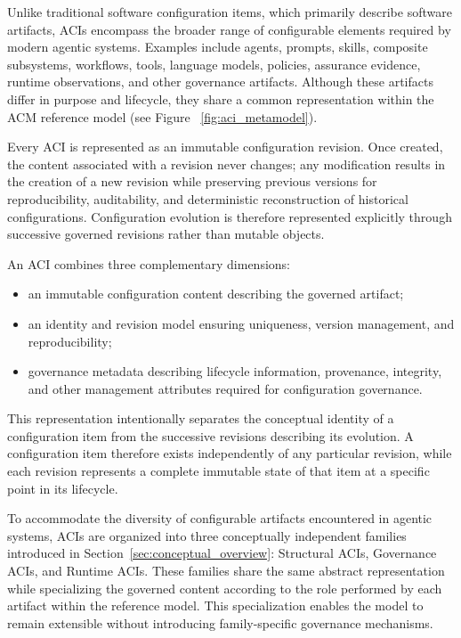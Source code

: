\documentclass[10pt]{article}
\begin{document}
Unlike traditional software configuration items, which primarily describe software artifacts, ACIs encompass the broader range of configurable elements required by modern agentic systems. Examples include agents, prompts, skills, composite subsystems, workflows, tools, language models, policies, assurance evidence, runtime observations, and other governance artifacts. Although these artifacts differ in purpose and lifecycle, they share a common representation within the ACM reference model (see Figure ~\ref{fig:aci_metamodel}).

Every ACI is represented as an immutable configuration revision. Once created, the content associated with a revision never changes; any modification results in the creation of a new revision while preserving previous versions for reproducibility, auditability, and deterministic reconstruction of historical configurations. Configuration evolution is therefore represented explicitly through successive governed revisions rather than mutable objects.

An ACI combines three complementary dimensions:

\begin{itemize}

\item an immutable configuration content describing the governed artifact;

\item an identity and revision model ensuring uniqueness, version management, and reproducibility;

\item governance metadata describing lifecycle information, provenance, integrity, and other management attributes required for configuration governance.

\end{itemize}

This representation intentionally separates the conceptual identity of a configuration item from the successive revisions describing its evolution. A configuration item therefore exists independently of any particular revision, while each revision represents a complete immutable state of that item at a specific point in its lifecycle.

To accommodate the diversity of configurable artifacts encountered in agentic systems, ACIs are organized into three conceptually independent families introduced in Section~\ref{sec:conceptual_overview}: Structural ACIs, Governance ACIs, and Runtime ACIs. These families share the same abstract representation while specializing the governed content according to the role performed by each artifact within the reference model. This specialization enables the model to remain extensible without introducing family-specific governance mechanisms.
\end{document}
